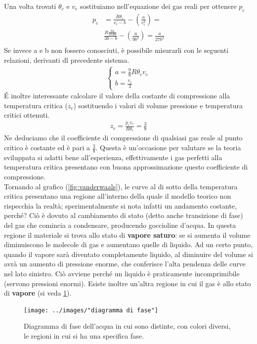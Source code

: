 \documentclass[10pt,a4paper]{article}
\begin{document}
Una volta trovati $\theta_c$ e $v_c$ sostituiamo nell'equazione dei gas reali per ottenere $p_c$
\begin{align*}
	p_c &= \frac{R \theta_c}{v_c - b}-  \left(\frac{a}{v_c^2}\right) = \\
	&\frac{R \frac{8a}{27 R b}}{3b - b}-  \left(\frac{a}{9b^2}\right) = \frac{a}{27 b^2}\\
\end{align*}
Se invece a e b non fossero conosciuti, è possibile misurarli con le seguenti relazioni, derivanti dl precedente sistema. 
\begin{align*}
\begin{cases}
a = \frac{9}{8} R \theta_c v_c\\
b = \frac{v_c}{3}
\end{cases}
\end{align*}
\'{E} inoltre interessante calcolare il valore della costante di compressione alla temperatura critica ($z_c$) sostituendo i valori di volume pressione e temperatura critici ottenuti. 
\begin{align*}
z_c = \frac{p_c v_c }{R \theta_c} = \frac{3}{8}
\end{align*}
Ne deduciamo che il coefficiente di compressione di qualsiasi gas reale al punto critico è costante ed è pari a $\frac{3}{8}$. Questa è un'occasione per valutare se la teoria sviluppata si adatti bene all'esperienza, effettivamente i gas perfetti alla temperatura critica presentano con buona approssimazione questo coefficiente di compressione.\\
Tornando al grafico (\ref{fig:vanderwaals}), le curve al di sotto della temperatura critica presentano una regione all'interno della quale il modello teorico non rispecchia la realtà; sperimentalmente si nota infatti un andamento costante, perché? Ciò è dovuto al cambiamento di stato (detto anche transizione di fase) del gas che comincia a condensare, producendo goccioline d'acqua. In questa regione il materiale si trova allo stato di \textbf{vapore saturo}: se si aumenta il volume diminuiscono le molecole di gas e aumentano quelle di liquido. Ad un certo punto, quando il vapore sarà diventato completamente liquido, al diminuire del volume si avrà un aumento di pressione enorme, che conferisce l'alta pendenza delle curve nel lato sinistro. Ciò avviene perché un liquido è praticamente incomprimibile (servono pressioni enormi). Esiste inoltre un'altra regione in cui il gas è allo stato di \textbf{vapore} (si veda \ref{fig:diagramma-di-fase}). 
\begin{figure}[h!]
	\centering
	\texttt{[image: ../images/"diagramma di fase"]}
	\caption{Diagramma di fase dell'acqua in cui sono distinte, con colori diversi, le regioni in cui si ha una specifica fase.}
	\label{fig:diagramma-di-fase}
\end{figure}
\end{document}
